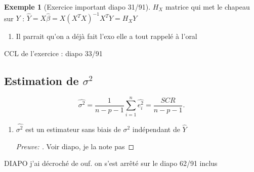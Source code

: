 \documentclass{article}
\theoremstyle{plain}%
\theoremstyle{definition}
\newtheorem{exmp}{Exemple}[section]
\theoremstyle{remark}
\begin{document}
\begin{exmp}[Exercice important diapo 31/91]
    $ H_X $ matrice qui met le chapeau sur $ Y $ : $ \hat{Y} = X \hat{\beta } = X (X^TX)^{-1} X^T Y = H_X Y $ 
    \begin{enumerate}
        \item Il parrait qu'on a déjà fait l'exo elle a tout rappelé à l'oral 
    \end{enumerate}
    CCL de l'exercice : diapo 33/91
\end{exmp}

\subsection{Estimation de $\sigma ^2$}

\[
    \hat{\sigma ^2} = \frac{1}{n-p-1}\sum_{i=1}^{n} \hat{e_i^2} = \frac{SCR}{n-p-1}
.\]
\begin{enumerate}
    \item $ \hat{\sigma ^2} $ est un estimateur sans biais de $ \sigma ^2 $ indépendant de $ \hat{Y} $ 
    \begin{proof}[Preuve: ]
        Voir diapo, je la note pas 
    \end{proof}
    
    
\end{enumerate}
DIAPO j'ai décroché de ouf. on s'est arrêté sur le diapo 62/91 inclus
\end{document}
